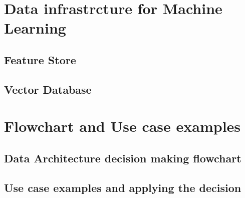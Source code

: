 \documentclass[a4paper, 11pt]{article}
\begin{document}
    \section{Data infrastrcture for Machine Learning}

    \subsection{Feature Store}

    \subsection{Vector Database}

    \section{Flowchart and Use case examples}

    \subsection{Data Architecture decision making flowchart}

    \subsection{Use case examples and applying the decision}
\end{document}

